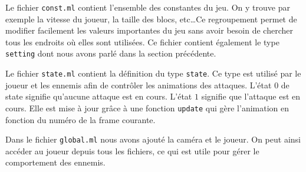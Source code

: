 \documentclass{article}
\begin{document}
Le fichier \verb|const.ml| contient l'ensemble des constantes du jeu. On y trouve par exemple la vitesse du joueur,
la taille des blocs, etc\dots Ce regroupement permet de modifier facilement les valeurs importantes du jeu sans 
avoir besoin de chercher tous les endroits où elles sont utilisées. Ce fichier contient également le type \verb|setting| 
dont nous avons parlé dans la section précédente.

Le fichier \verb|state.ml| contient la définition du type \texttt{state}. Ce type est utilisé par le joueur et les ennemis 
afin de contrôler les animations des attaques. L'état $0$ de state signifie qu'aucune attaque est en cours. L'état $1$ 
signifie que l'attaque est en cours. Elle est mise à jour grâce à une fonction \verb|update| qui gère l'animation en 
fonction du numéro de la frame courante.

Dans le fichier \verb|global.ml| nous avons ajouté la caméra et le joueur. On peut ainsi accéder au joueur depuis tous les 
fichiers, ce qui est utile pour gérer le comportement des ennemis.
\end{document}
